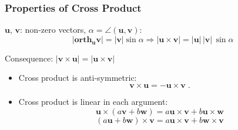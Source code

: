 \begin{frame}
 \frametitle{Properties of Cross Product}

$\textbf{u}$, $\textbf{v}$: non-zero vectors, $\alpha = \angle(\textbf{u},\textbf{v})$:
%
$$|\textbf{orth}_{\bm{u}} \textbf{v}| = |\textbf{v}|\sin\alpha
\Longrightarrow |\textbf{u} \times \textbf{v}| = |\textbf{u}| \, |\textbf{v}| \, \sin{\alpha}$$

Consequence: $|\textbf{v} \times \textbf{u}|  = | \textbf{u} \times \textbf{v}|$

\begin{itemize}
 \item \pause Cross product is anti-symmetric:
%
$$\textbf{v} \times \textbf{u} = - \textbf{u} \times \textbf{v} \; .$$
%
\item \pause Cross product is linear in each argument:
%
$$ \textbf{u} \times (a\textbf{v} + b\textbf{w}) =
a \textbf{u} \times \textbf{v} + b \textbf{u} \times \textbf{w}$$
%
$$(a\textbf{u} + b\textbf{w}) \times \textbf{v} =
a \textbf{u} \times \textbf{v} + b \textbf{w} \times \textbf{v}$$
\end{itemize}

\end{frame}